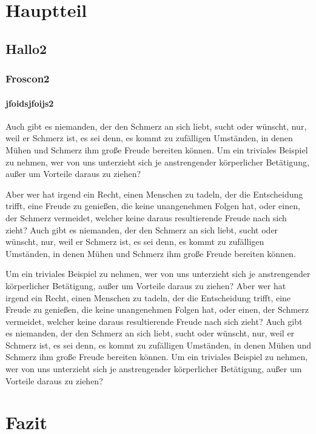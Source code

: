 \documentclass[12pt]{scrreprt}
\begin{document}
\chapter{Hauptteil}

\section{Hallo2}

\subsection{Froscon2}

\subsubsection{jfoidsjfoijs2}

Auch gibt es niemanden, der den Schmerz an sich liebt, sucht oder wünscht, nur, weil er Schmerz ist, es sei denn, es kommt zu zufälligen Umständen, in denen Mühen und Schmerz ihm große Freude bereiten können. Um ein triviales Beispiel zu nehmen, wer von uns unterzieht sich je anstrengender körperlicher Betätigung, außer um Vorteile daraus zu ziehen?

Aber wer hat irgend ein Recht, einen Menschen zu tadeln, der die Entscheidung trifft, eine Freude zu genießen, die keine unangenehmen Folgen hat, oder einen, der Schmerz vermeidet, welcher keine daraus resultierende Freude nach sich zieht? Auch gibt es niemanden, der den Schmerz an sich liebt, sucht oder wünscht, nur, weil er Schmerz ist, es sei denn, es kommt zu zufälligen Umständen, in denen Mühen und Schmerz ihm große Freude bereiten können.

Um ein triviales Beispiel zu nehmen, wer von uns unterzieht sich je anstrengender körperlicher Betätigung, außer um Vorteile daraus zu ziehen? Aber wer hat irgend ein Recht, einen Menschen zu tadeln, der die Entscheidung trifft, eine Freude zu genießen, die keine unangenehmen Folgen hat, oder einen, der Schmerz vermeidet, welcher keine daraus resultierende Freude nach sich zieht? Auch gibt es niemanden, der den Schmerz an sich liebt, sucht oder wünscht, nur, weil er Schmerz ist, es sei denn, es kommt zu zufälligen Umständen, in denen Mühen und Schmerz ihm große Freude bereiten können. Um ein triviales Beispiel zu nehmen, wer von uns unterzieht sich je anstrengender körperlicher Betätigung, außer um Vorteile daraus zu ziehen?

\chapter{Fazit}
\end{document}
